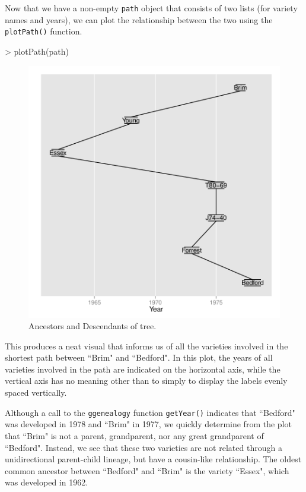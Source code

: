 \documentclass{article}
\numberwithin{equation}{section} %
\newcommand{\pkg}[1]{{\texttt{#1}}}
\begin{document}
Now that we have a non-empty \texttt{path} object that consists of two lists (for variety names and years), we can plot the relationship between the two using the \texttt{plotPath()} function.

\begin{Schunk}
\begin{Sinput}
> plotPath(path)
\end{Sinput}
\end{Schunk}

\begin{figure} 
  \begin{center} 
\includegraphics{ggenealogy-plotPath1}
\end{center} 
\caption{Ancestors and Descendants of tree.}
\label{fig:plotPath1}
\end{figure}

This produces a neat visual that informs us of all the varieties involved in the shortest path between ``Brim" and ``Bedford". In this plot, the years of all varieties involved in the path are indicated on the horizontal axis, while the vertical axis has no meaning other than to simply to display the labels evenly spaced vertically. 

Although a call to the \pkg{ggenealogy} function \texttt{getYear()} indicates that ``Bedford" was developed in 1978 and ``Brim" in 1977, we quickly determine from the plot that ``Brim" is not a parent, grandparent, nor any great grandparent of ``Bedford". Instead, we see that these two varieties are not related through a unidirectional parent-child lineage, but have a cousin-like relationship. The oldest common ancestor between ``Bedford" and ``Brim" is the variety ``Essex", which was developed in 1962.
\end{document}
